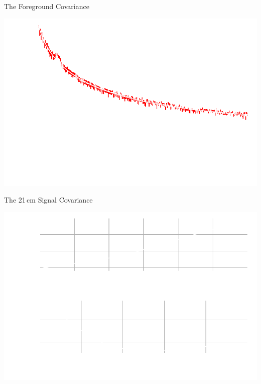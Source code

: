 \documentclass{beamer}
\begin{document}
\begin{frame}{The Foreground Covariance}
    \begin{center}
        \includegraphics[height=0.75\textheight]{figures/foreground-covariance/foreground-covariance-06}
    \end{center}
\end{frame}

\begin{frame}{The 21\,cm Signal Covariance}
    \begin{center}
        \includegraphics[height=0.75\textheight]{figures/sky-covariance/sky-covariance}
    \end{center}
\end{frame}
\end{document}
